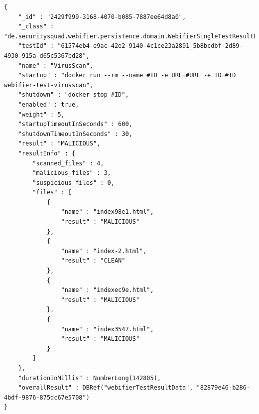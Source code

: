 \begin{scriptsize}
\begin{lstlisting}
{
    "_id" : "2429f999-3168-4070-b085-7887ee64d8a0",
    "_class" : "de.securitysquad.webifier.persistence.domain.WebifierSingleTestResultData",
    "testId" : "61574eb4-e9ac-42e2-9140-4c1ce23a2891_5b8bcdbf-2d89-4930-915a-d65c5367bd28",
    "name" : "VirusScan",
    "startup" : "docker run --rm --name #ID -e URL=#URL -e ID=#ID webifier-test-virusscan",
    "shutdown" : "docker stop #ID",
    "enabled" : true,
    "weight" : 5,
    "startupTimeoutInSeconds" : 600,
    "shutdownTimeoutInSeconds" : 30,
    "result" : "MALICIOUS",
    "resultInfo" : {
        "scanned_files" : 4,
        "malicious_files" : 3,
        "suspicious_files" : 0,
        "files" : [
            {
                "name" : "index98e1.html",
                "result" : "MALICIOUS"
            },
            {
                "name" : "index-2.html",
                "result" : "CLEAN"
            },
            {
                "name" : "indexec9e.html",
                "result" : "MALICIOUS"
            },
            {
                "name" : "index3547.html",
                "result" : "MALICIOUS"
            }
        ]
    },
    "durationInMillis" : NumberLong(142805),
    "overallResult" : DBRef("webifierTestResultData", "82879e46-b286-4bdf-9876-875dc67e5708")
}
\end{lstlisting}
\end{scriptsize}

\newpage

